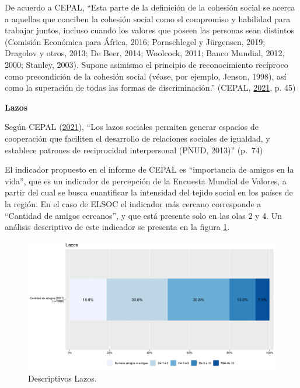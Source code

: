 \documentclass[
  12pt,
]{book}
\begin{document}
De acuerdo a CEPAL, ``Esta parte de la definición de la cohesión social se acerca a aquellas que conciben la cohesión social como el compromiso y habilidad para trabajar juntos, incluso cuando los valores que poseen las personas sean distintos (Comisión Económica para África, 2016; Pornschlegel y Jürgensen, 2019; Dragolov y otros, 2013; De Beer, 2014; Woolcock, 2011; Banco Mundial, 2012, 2000; Stanley, 2003). Supone asimismo el principio de reconocimiento recíproco como precondición de la cohesión social (véase, por ejemplo, Jenson, 1998), así como la superación de todas las formas de discriminación.'' (CEPAL, \protect\hyperlink{ref-cepal_Cohesion_2021}{2021}, p. 45)

\textbf{Lazos}

Según CEPAL (\protect\hyperlink{ref-cepal_Cohesion_2021}{2021}), ``Los lazos sociales permiten generar espacios de cooperación que faciliten el desarrollo de relaciones sociales de igualdad, y establece patrones de reciprocidad interpersonal (PNUD, 2013)'' (p.~74)

El indicador propuesto en el informe de CEPAL es ``importancia de amigos en la vida'', que es un indicador de percepción de la Encuesta Mundial de Valores, a partir del cual se busca cuantificar la intensidad del tejido social en los países de la región. En el caso de ELSOC el indicador más cercano corresponde a ``Cantidad de amigos cercanos'', y que está presente solo en las olas 2 y 4. Un análisis descriptivo de este indicador se presenta en la figura \ref{fig:lazos}.

\begin{figure}[H]

{\centering \includegraphics[width=1\linewidth,height=1\textheight]{output/graphs/lazos} 

}

\caption{Descriptivos Lazos.}\label{fig:lazos}
\end{figure}
\end{document}
